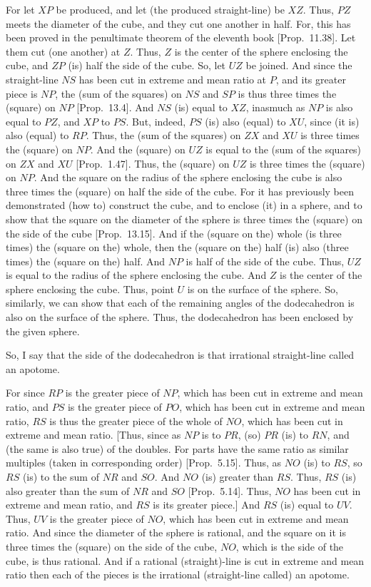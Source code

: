 \begin{Parallel}{}{}
{For let $XP$ be produced, and let (the produced straight-line) be $XZ$. Thus, $PZ$ meets
the diameter of the cube, and they cut one another in half.
For, this has been proved in the penultimate theorem of the eleventh book [Prop.~11.38]. Let them cut (one another) at $Z$. Thus, $Z$ is the
center of the sphere enclosing the cube, and $ZP$ (is) half the side of
the cube. So, let $UZ$ be joined. And since the straight-line 
$NS$ has been cut in extreme and mean ratio at $P$, and its greater piece
is $NP$, the (sum of the squares) on $NS$ and $SP$
is thus three times the (square) on $NP$ [Prop.~13.4]. And $NS$ (is)
equal to $XZ$, inasmuch as $NP$ is also equal to $PZ$, and
$XP$ to $PS$. But, indeed, $PS$ (is) also (equal) to $XU$,
since (it is) also (equal) to $RP$. Thus, the (sum of the squares) on 
$ZX$ and $XU$ is three times the (square) on $NP$.
And  the (square)
on $UZ$ is equal to the (sum of the squares) on $ZX$ and $XU$ [Prop.~1.47].  Thus, the (square) on $UZ$ is three times the
(square) on $NP$. 
 And the square on the
radius of the sphere enclosing the cube is also three times the (square) on half
the side of the cube. For it has previously been demonstrated (how to) construct 
the cube, and to enclose (it) in a sphere, and to show that the square on
the diameter of the sphere is three times the (square) on the
side of the cube [Prop.~13.15]. And if the (square on the) whole (is three
times) the (square on the) whole, then the (square on the) half (is) also (three times) the (square on the) half. 
And $NP$ is half of the side of the cube. Thus, $UZ$ is equal to
the radius of the sphere enclosing the cube. And $Z$ is the center of the
sphere enclosing the cube.
Thus, point $U$
is on the surface of the sphere. So, similarly, we can show that each of
the remaining angles of the dodecahedron is also  on the surface of the sphere. 
Thus, the dodecahedron has been enclosed by the given sphere.

So, I say that the side of the dodecahedron is that irrational straight-line
called an apotome.

For since  $RP$ is the greater piece of $NP$, which has been cut in extreme and mean ratio, and $PS$ is the greater piece of $PO$, which
has been cut in extreme and mean ratio,  $RS$ is thus the greater piece of the
whole of $NO$, which has been cut in extreme and mean ratio.
[Thus, since as $NP$ is to $PR$, (so) $PR$ (is) to $RN$, and  (the same is also true) of the doubles.
For parts have the same ratio as similar multiples (taken in corresponding
order) [Prop.~5.15]. Thus, as $NO$ (is) to $RS$, so $RS$
(is) to the sum of $NR$ and $SO$. And $NO$
(is) greater than $RS$. Thus, $RS$ (is) also
greater than the sum of $NR$ and $SO$ [Prop.~5.14]. Thus, $NO$
has been cut in extreme and mean ratio, and  $RS$ is its greater piece.]
And $RS$ (is) equal to $UV$. Thus, $UV$ is the greater piece of
$NO$, which has been cut in extreme and mean ratio. 
And since the diameter of the sphere is rational, and the square on it
is three times the (square) on the side of the cube,  $NO$, which is
the side of the cube, is thus rational. And if a rational (straight)-line
is cut in extreme and mean ratio then each of the
pieces is the irrational (straight-line called) an apotome.

}
\end{Parallel}
